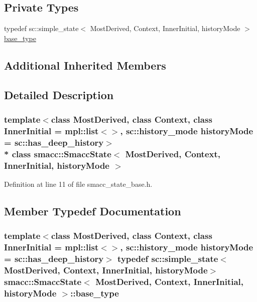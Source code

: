 \subsection*{Private Types}
\begin{DoxyCompactItemize}
\item 
typedef sc\+::simple\+\_\+state$<$ Most\+Derived, Context, Inner\+Initial, history\+Mode $>$ \hyperlink{classsmacc_1_1SmaccState_a68f547c6fe147554bbe607b6fcd8e40a}{base\+\_\+type}
\end{DoxyCompactItemize}
\subsection*{Additional Inherited Members}


\subsection{Detailed Description}
\subsubsection*{template$<$class Most\+Derived, class Context, class Inner\+Initial = mpl\+::list$<$$>$, sc\+::history\+\_\+mode history\+Mode = sc\+::has\+\_\+deep\+\_\+history$>$\\*
class smacc\+::\+Smacc\+State$<$ Most\+Derived, Context, Inner\+Initial, history\+Mode $>$}



Definition at line 11 of file smacc\+\_\+state\+\_\+base.\+h.



\subsection{Member Typedef Documentation}
\subsubsection[{\texorpdfstring{base\+\_\+type}{base_type}}]{\setlength{\rightskip}{0pt plus 5cm}template$<$class Most\+Derived, class Context, class Inner\+Initial = mpl\+::list$<$$>$, sc\+::history\+\_\+mode history\+Mode = sc\+::has\+\_\+deep\+\_\+history$>$ typedef sc\+::simple\+\_\+state$<$Most\+Derived, Context, Inner\+Initial, history\+Mode$>$ {\bf smacc\+::\+Smacc\+State}$<$ Most\+Derived, Context, Inner\+Initial, history\+Mode $>$\+::{\bf base\+\_\+type}\hspace{0.3cm}{\ttfamily [private]}}\hypertarget{classsmacc_1_1SmaccState_a68f547c6fe147554bbe607b6fcd8e40a}{}\label{classsmacc_1_1SmaccState_a68f547c6fe147554bbe607b6fcd8e40a}


